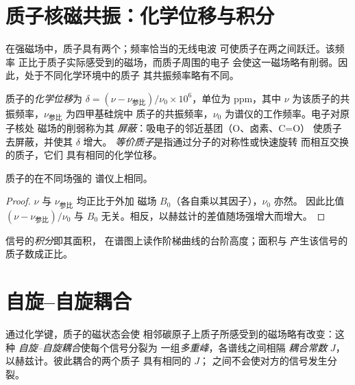 \section{质子核磁共振：化学位移与积分}

在强磁场中，质子具有两个；频率恰当的无线电波
可使质子在两之间跃迁。该频率
正比于质子实际感受到的磁场，而质子周围的电子
会使这一磁场略有削弱。因此，处于不同化学环境中的质子
其共振频率略有不同。

\begin{definition}\label{def:b1:structure-spectroscopy:chemical-shift}
质子的\emph{化学位移}为
$\delta = (\nu - \nu_{\text{参比}})/\nu_0 \times 10^6$，单位为 \unit{ppm}，其中
$\nu$ 为该质子的共振频率，$\nu_{\text{参比}}$ 为四甲基硅烷中
质子的共振频率，$\nu_0$ 为谱仪的工作频率。电子对原子核处
磁场的削弱称为其
\emph{屏蔽}：吸电子的邻近基团（O、卤素、C=O）
使质子去屏蔽，并使其 $\delta$ 增大。
\emph{等价质子}是指通过分子的对称性或快速旋转
而相互交换的质子，它们
具有相同的化学位移。
\end{definition}

\begin{proposition}[化学位移与谱仪无关]\label{prop:b1:structure-spectroscopy:shift-field-independent}
质子的在不同场强的
谱仪上相同。
\end{proposition}

\begin{proof}
$\nu$ 与 $\nu_{\text{参比}}$ 均正比于外加
磁场 $B_0$（各自乘以其因子），$\nu_0$ 亦然。
因此比值 $(\nu - \nu_{\text{参比}})/\nu_0$ 与
$B_0$ 无关。相反，以赫兹计的差值随场强增大而增大。
\end{proof}

\begin{definition}[积分]\label{def:b1:structure-spectroscopy:integration}
信号的\emph{积分}即其面积，
在谱图上读作阶梯曲线的台阶高度；面积与
产生该信号的质子数成正比。
\end{definition}

\section{自旋–自旋耦合}

\begin{definition}\label{def:b1:structure-spectroscopy:coupling}
通过化学键，质子的磁状态会使
相邻碳原子上质子所感受到的磁场略有改变：这种
\emph{自旋–自旋耦合}使每个信号分裂为
一组\emph{多重峰}，各谱线之间相隔
\emph{耦合常数} $J$，以赫兹计。彼此耦合的两个质子
具有相同的 $J$；
之间不会使对方的信号发生分裂。
\end{definition}

